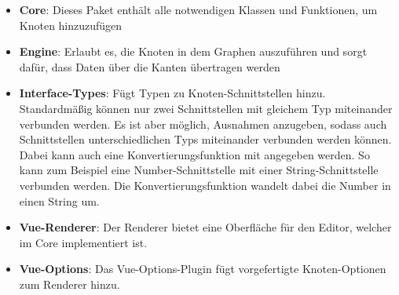 \begin{itemize}
    \item \textbf{Core}: Dieses Paket enthält alle notwendigen Klassen und Funktionen, um Knoten hinzuzufügen 
    \item \textbf{Engine}: Erlaubt es, die Knoten in dem Graphen auszuführen und sorgt dafür, dass Daten über die Kanten übertragen werden
    \item \textbf{Interface-Types}: Fügt Typen zu Knoten-Schnittstellen hinzu. Standardmäßig können nur zwei Schnittstellen mit gleichem Typ miteinander verbunden werden. Es ist aber möglich, Ausnahmen anzugeben, sodass auch Schnittstellen unterschiedlichen Typs miteinander verbunden werden können. Dabei kann auch eine Konvertierungsfunktion mit angegeben werden. So kann zum Beispiel eine Number-Schnittstelle mit einer String-Schnittstelle verbunden werden. Die Konvertierungsfunktion wandelt dabei die Number in einen String um. 
    \item \textbf{Vue-Renderer}: Der Renderer bietet eine Oberfläche für den Editor, welcher im Core implementiert ist.
    \item \textbf{Vue-Options}: Das Vue-Options-Plugin fügt vorgefertigte Knoten-Optionen zum Renderer hinzu.
\end{itemize}